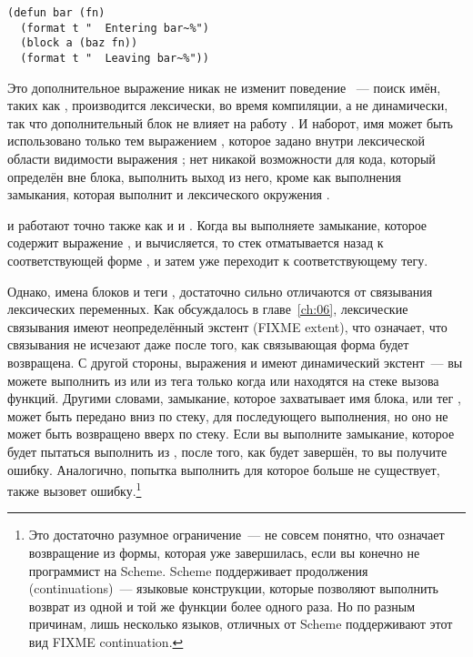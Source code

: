 \begin{lstlisting}
(defun bar (fn)
  (format t "  Entering bar~%")
  (block a (baz fn))
  (format t "  Leaving bar~%"))
\end{lstlisting}

Это дополнительное выражение  никак не изменит поведение ~--- поиск
имён, таких как , производится лексически, во время компиляции, а не динамически,
так что дополнительный блок не влияет на работу . И наборот, имя
 может быть использовано только тем выражением , которое
задано внутри лексической области видимости выражения ; нет никакой
возможности для кода, который определён вне блока, выполнить выход из него, кроме как
выполнения замыкания, которая выполнит  и лексического окружения
.

 и  работают точно также как и  и .
Когда вы выполняете замыкание, которое содержит выражение , и 
вычисляется, то стек отматывается назад к соответствующей форме , и затем
уже переходит к соответствующему тегу.

Однако, имена блоков  и теги , достаточно сильно отличаются от
связывания лексических переменных. Как обсуждалось в главе~\ref{ch:06}, лексические
связывания имеют неопределённый экстент (FIXME extent), что означает, что связывания не
исчезают даже после того, как связывающая форма будет возвращена. С другой стороны,
выражения  и  имеют динамический экстент~--- вы можете выполнить
 из  или  из тега  только когда
 или  находятся на стеке вызова функций. Другими словами,
замыкание, которое захватывает имя блока, или тег , может быть передано вниз
по стеку, для последующего выполнения, но оно не может быть возвращено вверх по
стеку. Если вы выполните замыкание, которое будет пытаться выполнить  из
, после того, как  будет завершён, то вы получите
ошибку. Аналогично, попытка выполнить  для  которое больше не
существует, также вызовет ошибку.\footnote{Это достаточно разумное ограничение~--- не
  совсем понятно, что означает возвращение из формы, которая уже завершилась, если вы
  конечно не программист на Scheme. Scheme поддерживает продолжения (continuations)~---
  языковые конструкции, которые позволяют выполнить возврат из одной и той же функции
  более одного раза. Но по разным причинам, лишь несколько языков, отличных от Scheme
  поддерживают этот вид FIXME continuation.}

